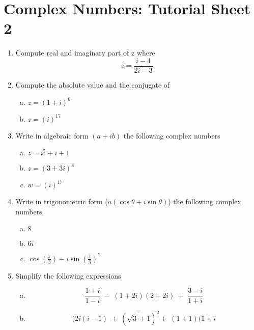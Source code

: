 \documentclass[a4paper,12pt]{article}
\begin{document}
\section*{Complex Numbers: Tutorial Sheet 2}


\begin{enumerate}

\item

 Compute real and imaginary part of  z where \[z = \frac{i - 4}{2i - 3}.\]



\item  Compute the absolute value and the conjugate of
\begin{enumerate}[(a)]
\item $z = (1 + i)^6$
\item $z = (i)^{17}$
\end{enumerate}

\item Write in algebraic form $(a + ib)$ the following complex numbers

\begin{multicols}{3}
\begin{enumerate}[(a)]
\item $z = i^5 + i + 1$
\item $z = (3 + 3i)^8$
\item $w = (i)^{17}$
\end{enumerate}
\end{multicols}



\item  Write in trigonometric form ($a(\cos \theta + i \sin \theta)$) the following complex numbers
\begin{multicols}{3}
\begin{enumerate}[(a)]
\item $8$
\item $6i$
\item $\cos (\frac{\pi}{3}) -i \sin(\frac{\pi}{3})^{7} $
\end{enumerate}
\end{multicols}




\item  Simplify the following expressions{}
\begin{enumerate}[(a)]
\item $$\frac{1+i}{1-i} \; - \;(1+2i)(2+2i) \;+\; \frac{3-i}{1+i}$$
\item $$(2i(i-1)\; +\;(\bar{\sqrt{3}+1})^2  +\;(1+1)\bar{(1+i} $$
\end{enumerate}


\end{enumerate}
\end{document}
